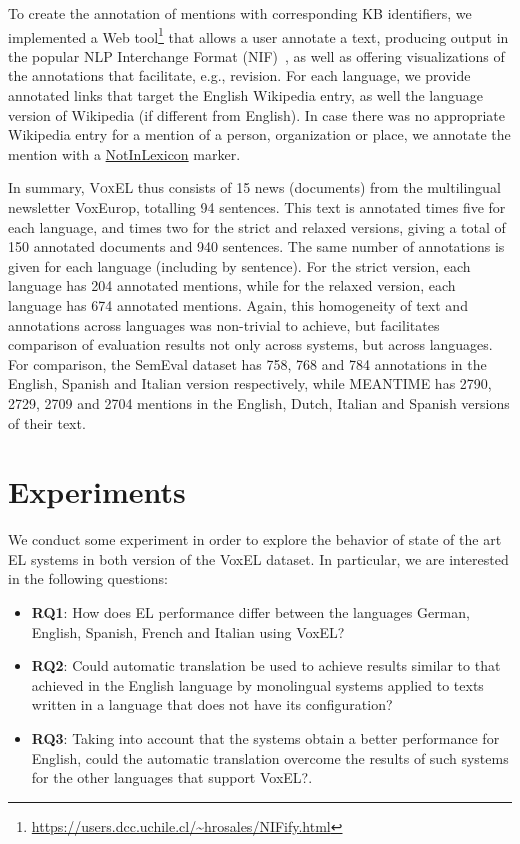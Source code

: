 \documentclass{llncs}
\begin{document}
To create the annotation of mentions with corresponding KB identifiers, we implemented a Web tool\footnote{\url{https://users.dcc.uchile.cl/~hrosales/NIFify.html}} that allows a user annotate a text, producing output in the popular NLP Interchange Format (NIF)~\cite{nif2013}, as well as offering visualizations of the annotations that facilitate, e.g., revision. For each language, we provide annotated links that target the English Wikipedia entry, as well the language version of Wikipedia (if different from English). In case there was no appropriate Wikipedia entry for a mention of a person, organization or place, we annotate the mention with a \url{NotInLexicon} marker.

In summary, \textsc{VoxEL} thus consists of 15 news (documents) from the multilingual newsletter VoxEurop, totalling 94 sentences. This text is annotated times five for each language, and times two for the strict and relaxed versions, giving a total of 150 annotated documents and 940 sentences. The same number of annotations is given for each language (including by sentence). For the strict version, each language has 204 annotated mentions, while for the relaxed version, each language has 674 annotated mentions. Again, this homogeneity of text and annotations across languages was non-trivial to achieve, but facilitates comparison of evaluation results not only across systems, but across languages. For comparison, the SemEval dataset has 758, 768 and 784 annotations in the English, Spanish and Italian version respectively, while MEANTIME has 2790, 2729, 2709 and 2704 mentions in the English, Dutch, Italian and Spanish versions of their text.

\section{Experiments}\label{sec:exp}

We conduct some experiment in order to explore the behavior of state of the art EL systems in both version of the VoxEL dataset. In particular, we are interested in the following questions:
\begin{itemize}
\item \textbf{RQ1}: How does EL performance differ between the languages German, English, Spanish, French and Italian using VoxEL? 
\item \textbf{RQ2}: Could automatic translation be used to achieve results similar to that achieved in the English language by monolingual systems applied to texts written in a language that does not have its configuration?
\item \textbf{RQ3}: Taking into account that the systems obtain a better performance for English, could the automatic translation overcome the results of such systems for the other languages that support VoxEL?.
\end{itemize}
\end{document}
